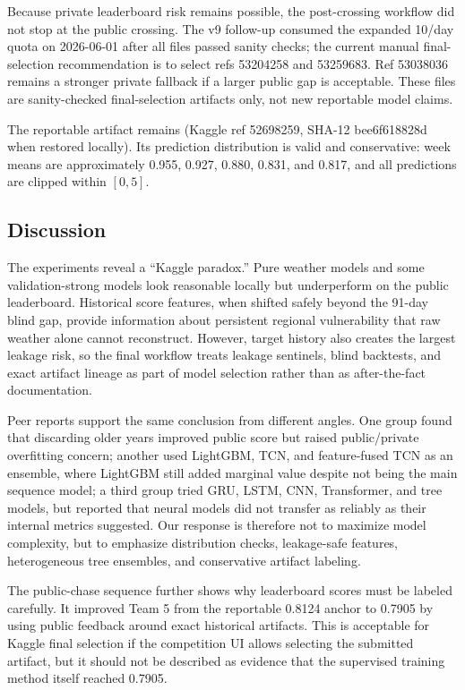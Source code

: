 \documentclass[conference]{IEEEtran}
\begin{document}
Because private leaderboard risk remains possible, the post-crossing workflow did
not stop at the public crossing. The v9 follow-up consumed the expanded
10/day quota on 2026-06-01 after all files passed sanity checks; the current
manual final-selection recommendation is to select refs 53204258 and 53259683.
Ref 53038036 remains a stronger private fallback if a larger public gap is
acceptable. These files are sanity-checked final-selection artifacts only, not new
reportable model claims.

The reportable artifact remains
(Kaggle ref 52698259, SHA-12 bee6f618828d when restored locally). Its
prediction distribution is valid and conservative: week means are approximately
0.955, 0.927, 0.880, 0.831, and 0.817, and all predictions are clipped within
$[0,5]$.

\subsection{Discussion}
The experiments reveal a ``Kaggle paradox.'' Pure weather models and some
validation-strong models look reasonable locally but underperform on the public
leaderboard. Historical score features, when shifted safely beyond the 91-day
blind gap, provide information about persistent regional vulnerability that raw
weather alone cannot reconstruct. However, target history also creates the
largest leakage risk, so the final workflow treats leakage sentinels, blind
backtests, and exact artifact lineage as part of model selection rather than as
after-the-fact documentation.

Peer reports support the same conclusion from different angles. One group found
that discarding older years improved public score but raised public/private
overfitting concern; another used LightGBM, TCN, and feature-fused TCN as an
ensemble, where LightGBM still added marginal value despite not being the main
sequence model; a third group tried GRU, LSTM, CNN, Transformer, and tree
models, but reported that neural models did not transfer as reliably as their
internal metrics suggested. Our response is therefore not to maximize model
complexity, but to emphasize distribution checks, leakage-safe features,
heterogeneous tree ensembles, and conservative artifact labeling.

The public-chase sequence further shows why leaderboard scores must be labeled
carefully. It improved Team 5 from the reportable 0.8124 anchor to 0.7905 by
using public feedback around exact historical artifacts. This is acceptable for
Kaggle final selection if the competition UI allows selecting the submitted
artifact, but it should not be described as evidence that the supervised
training method itself reached 0.7905.
\end{document}
